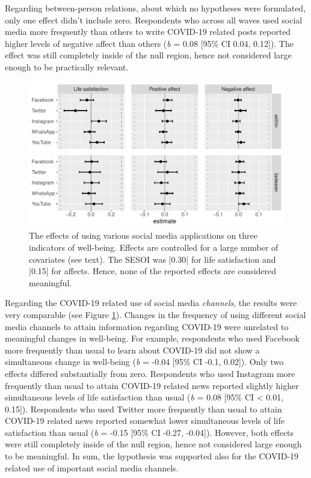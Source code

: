 \documentclass[
  english,
  man,mask,floatsintext]{apa6}
\begin{document}
Regarding between-person relations, about which no hypotheses were formulated, only one effect didn't include zero.
Respondents who across all waves used social media more frequently than others to write COVID-19 related posts reported higher levels of negative affect than others (\emph{b} = 0.08 {[}95\% CI 0.04, 0.12{]}).
The effect was still completely inside of the null region, hence not considered large enough to be practically relevant.

\begin{figure}
\includegraphics[width=\textwidth]{figures/fig_results_channel} \caption{The effects of using various social media applications on three indicators of well-being. Effects are controlled for a large number of covariates (see text). The SESOI was |0.30| for life satisfaction and |0.15| for affects. Hence, none of the reported effects are considered meaningful.}\label{fig:res-channels}
\end{figure}

Regarding the COVID-19 related use of social media \emph{channels}, the results were very comparable (see Figure \ref{fig:res-channels}).
Changes in the frequency of using different social media channels to attain information regarding COVID-19 were unrelated to meaningful changes in well-being.
For example, respondents who used Facebook more frequently than usual to learn about COVID-19 did not show a simultaneous change in well-being (\emph{b} = -0.04 {[}95\% CI -0.1, 0.02{]}).
Only two effects differed substantially from zero.
Respondents who used Instagram more frequently than usual to attain COVID-19 related news reported slightly higher simultaneous levels of life satisfaction than usual (\emph{b} = 0.08 {[}95\% CI \textless{} 0.01, 0.15{]}).
Respondents who used Twitter more frequently than usual to attain COVID-19 related news reported somewhat lower simultaneous levels of life satisfaction than usual (\emph{b} = -0.15 {[}95\% CI -0.27, -0.04{]}).
However, both effects were still completely inside of the null region, hence not considered large enough to be meaningful.
In sum, the hypothesis was supported also for the COVID-19 related use of important social media channels.
\end{document}
